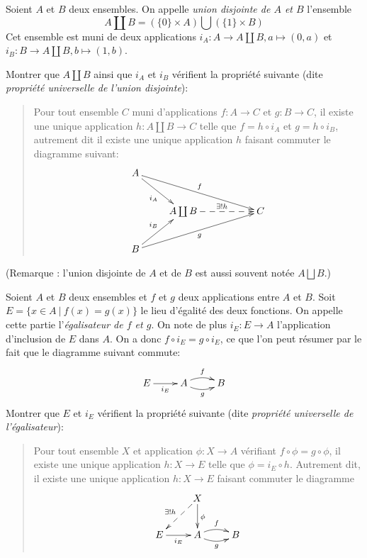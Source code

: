 \begin{exercice}\label{exo-coproduit}
Soient $A$ et $B$ deux ensembles. On appelle \emph{union disjointe  de $A$ et $B$} l'ensemble
\[
A\coprod B = (\{0\}\times A) \bigcup (\{1\}\times B)
\]
Cet ensemble est muni de deux applications $i_A : A\to A\coprod B, a\mapsto (0,a)$ et  $i_B : B\to A\coprod B, b\mapsto (1,b)$.

Montrer que $A\coprod B$ ainsi que $i_A$ et $i_B$ vérifient la propriété suivante (dite \emph{propriété universelle  de l'union disjointe}): 
\begin{quote}
Pour tout ensemble  $C$ muni d'applications $f : A\to C$ et $g : B\to C$, il existe une unique application $h : A\coprod B \to C$ telle que $f = h\circ i_A$ et $g = h\circ i_B$, autrement dit il existe une unique application $h$ faisant commuter le diagramme  suivant:
\[ 
\xymatrix{
A \ar[dr]_{i_A} \ar[drrr]^{f}& & & \\
&  A\coprod B \ar@{-->}[rr]^{\exists !h}  & & C\\
B \ar[ur]^{i_B} \ar[urrr]_{g}& & &
}\]
\end{quote}
(Remarque : l'union disjointe de $A$ et de $B$ est aussi souvent notée  $A\bigsqcup B$.)
\end{exercice}


\begin{exercice}[Égalisateurs]\label{exo-egalisateur}
Soient $A$ et $B$ deux ensembles et $f$ et $g$ deux applications entre $A$ et $B$. Soit $E = \{x\in A\:|\: f(x)=g(x)\}$ le lieu d'égalité des deux fonctions. On appelle cette partie l'\emph{égalisateur de $f$ et $g$}. On note de plus $i_E : E\to A$ l'application d'inclusion de $E$ dans $A$. On a donc $f\circ i_E = g\circ i_E$, ce que l'on peut résumer par le fait que le diagramme suivant commute:
\[
\xymatrix{
E \ar[r]_{i_E}& A\ar@/^/[r] ^{f} \ar@/_/[r]_{g} & B
}
\]
Montrer que $E$ et $i_E$ vérifient la propriété suivante (dite \emph{propriété universelle de l'égalisateur}):
\begin{quote}
Pour tout ensemble $X$ et application $\phi : X\to A$ vérifiant $f\circ \phi = g\circ \phi$,  il existe une unique application $h : X\to E$ telle que $\phi = i_E\circ h $. Autrement dit, il existe une unique application $h : X\to E$ faisant commuter le diagramme 
\[
\xymatrix{
& X \ar[d]^{\phi} \ar@{-->}_{\exists ! h}[dl]& \\
E \ar[r]_{i_E}& A\ar@/^/[r] ^{f} \ar@/_/[r]_{g} & B
}
\]
\end{quote}
\end{exercice}



